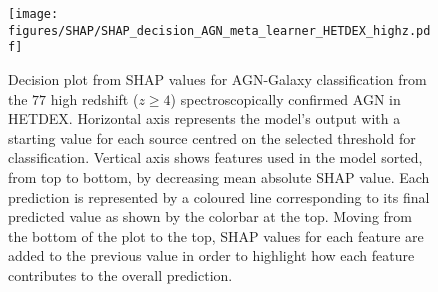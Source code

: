 \documentclass{aa}
\begin{document}
\begin{figure}[t]
    \centering
    \begin{minipage}{0.65\columnwidth}
    \texttt{[image: figures/SHAP/SHAP\_decision\_AGN\_meta\_learner\_HETDEX\_highz.pdf]}
    \end{minipage}%
    \caption{Decision plot from SHAP values for AGN-Galaxy classification from the $77$ high redshift ($z \geq 4$) spectroscopically confirmed AGN in HETDEX. Horizontal axis represents the model's output with a starting value for each source centred on the selected threshold for classification. Vertical axis shows features used in the model sorted, from top to bottom, by decreasing mean absolute SHAP value. Each prediction is represented by a coloured line corresponding to its final predicted value as shown by the colorbar at the top. Moving from the bottom of the plot to the top, SHAP values for each feature are added to the previous value in order to highlight how each feature contributes to the overall prediction.}
   \label{fig:SHAP_decision_AGN_meta_HETDEX_high_z}
\end{figure}
\end{document}
